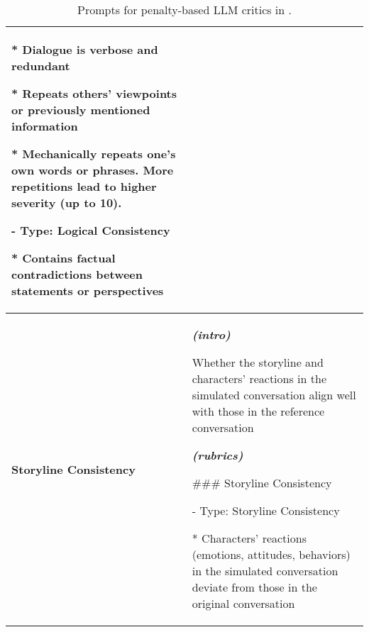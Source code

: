 \begin{table*}[h]
{\begin{tabular}{p{0.5in}|p{5.4in}}
       * Dialogue is verbose and redundant
       
       * Repeats others' viewpoints or previously mentioned information
       
       * Mechanically repeats one's own words or phrases. More repetitions lead to higher severity (up to 10). 
  
     - Type: Logical Consistency
     
       * Contains factual contradictions between statements or perspectives
  \\ \hline
  
  \textbf{Storyline \qquad Consistency} & 
  
  \textbf{\textit{(intro)}}
  
  Whether the storyline and characters' reactions in the simulated conversation align well with those in the reference conversation
  
  \quad
  
  \textbf{\textit{(rubrics)}}
  
  \#\#\# Storyline Consistency
  
     - Type: Storyline Consistency
     
       * Characters' reactions (emotions, attitudes, behaviors) in the simulated conversation deviate from those in the original conversation    
      \\ 
  \bottomrule
  
  \end{tabular}}
  
  \caption{Prompts for penalty-based LLM critics in \method. }
  \label{tab:prompts_eval_2}
  \end{table*}
  
  